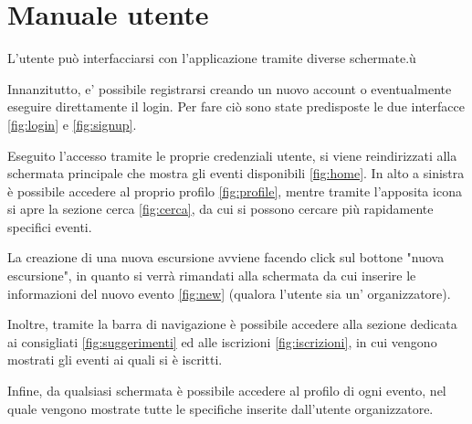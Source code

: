 \section*{Manuale utente}

L'utente può interfacciarsi con l'applicazione tramite diverse schermate.ù

Innanzitutto, e' possibile registrarsi creando un nuovo account o eventualmente eseguire direttamente il login. 
Per fare ciò sono state predisposte le due interfacce \ref{fig:login} e \ref*{fig:signup}.

Eseguito l'accesso tramite le proprie credenziali utente, si viene reindirizzati alla schermata principale che mostra gli eventi
disponibili \ref{fig:home}. In alto a sinistra è possibile accedere al proprio profilo \ref*{fig:profile}, mentre tramite l'apposita
icona si apre la sezione cerca \ref{fig:cerca}, da cui si possono cercare più rapidamente specifici eventi.

La creazione di una nuova escursione avviene facendo click sul bottone "nuova escursione", in quanto si verrà rimandati alla schermata 
da cui inserire le informazioni del nuovo evento \ref*{fig:new} (qualora l'utente sia un' organizzatore).

Inoltre, tramite la barra di navigazione è possibile accedere alla sezione dedicata ai consigliati \ref*{fig:suggerimenti} ed alle iscrizioni \ref{fig:iscrizioni}, in cui
vengono mostrati gli eventi ai quali si è iscritti. 

Infine, da qualsiasi schermata è possibile accedere al profilo di ogni evento, nel quale vengono mostrate tutte le specifiche inserite
dall'utente organizzatore.


